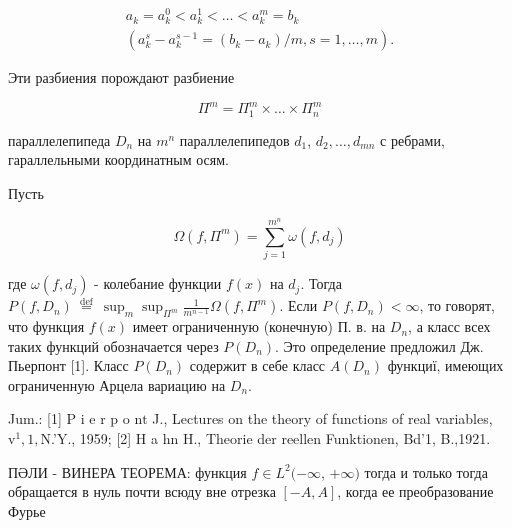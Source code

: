 \documentclass[10pt]{article}
\begin{document}
\[

\begin{gathered}

a_{k}=a_{k}^{0}<a_{k}^{1}<\ldots<a_{k}^{m}=b_{k} \\

\left(a_{k}^{s}-a_{k}^{s-1}=\left(b_{k}-a_{k}\right) / m, s=1, \ldots, m\right) .

\end{gathered}

\]



Эти разбиения порождают разбиение



\[

\Pi^{m}=\Pi_{1}^{m} \times \ldots \times \Pi_{n}^{m}

\]



параллелепипеда $D_{n}$ на $m^{n}$ параллелепипедов $d_{1}$, $d_{2}, \ldots, d_{m n}$ с ребрами, гараллельными координатным осям.



Пусть



\[

\Omega\left(f, \Pi^{m}\right)=\sum_{j=1}^{m^{n}} \omega\left(f, d_{j}\right)

\]



где $\omega\left(f, d_{j}\right)$ - колебание функции $f(x)$ на $d_{j}$. Тогда $P\left(f, D_{n}\right) \stackrel{\text { def }}{=} \sup _{m} \sup _{\Pi^{m}} \frac{1}{m^{n-1}} \Omega\left(f, \Pi^{m}\right)$. Если $P\left(f, D_{n}\right)<\infty$, то говорят, что функция $f(x)$ имеет ограниченную (конечную) П. в. на $D_{n}$, а класс всех таких функций обозначается через $P\left(D_{n}\right)$. Это определение предложил Дж. Пьерпонт [1]. Класс $P\left(D_{n}\right)$ содержит в себе класс $A\left(D_{n}\right)$ функциї, имеющих ограниченную Арцела вариацию на $D_{n}$.



Jum.: [1] P i e r p o $\mathrm{n} \mathrm{t}$ J., Lectures on the theory of functions of real variables, $\mathrm{v}^{1}, \mathrm{1}, \mathrm{N}$.'Y., 1959; [2] $\mathrm{H}$ a $\mathrm{h} \mathrm{n}$ H., Theorie der reellen Funktionen, Bd'1, B.,1921.



ПӘЛИ - ВИНЕРА ТЕОРЕМА: функция $f \in L^{2}(-\infty$, $+\infty)$ тогда и только тогда обращается в нуль почти всюду вне отрезка $[-A, A]$, когда ее преобразование Фурье
\end{document}
